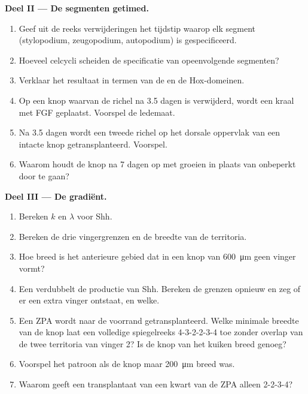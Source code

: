 \begin{problem}
\medskip
\noindent\textbf{Deel II --- De segmenten getimed.}
\begin{enumerate}[resume]
  \item Geef uit de reeks verwijderingen het tijdstip waarop elk segment
        (stylopodium, zeugopodium, autopodium) is gespecificeerd.
  \item Hoeveel celcycli scheiden de specificatie van opeenvolgende
        segmenten?
  \item Verklaar het resultaat in termen van de  en de
        Hox-domeinen.
  \item Op een knop waarvan de richel na 3.5 dagen is verwijderd, wordt een
        kraal met FGF geplaatst. Voorspel de ledemaat.
  \item Na 3.5 dagen wordt een tweede richel op het dorsale oppervlak van
        een intacte knop getransplanteerd. Voorspel.
  \item Waarom houdt de knop na 7 dagen op met groeien in plaats van
        onbeperkt door te gaan?
\end{enumerate}

\medskip
\noindent\textbf{Deel III --- De gradiënt.}
\begin{enumerate}[resume]
  \item Bereken $k$ en $\lambda$ voor Shh.
  \item Bereken de drie vingergrenzen en de breedte van de territoria.
  \item Hoe breed is het anterieure gebied dat in een knop van
        \qty{600}{\micro m} geen vinger vormt?
  \item Een  verdubbelt de productie van Shh. Bereken de grenzen
        opnieuw en zeg of er een extra vinger ontstaat, en welke.
  \item Een ZPA wordt naar de voorrand getransplanteerd. Welke minimale
        breedte van de knop laat een volledige spiegelreeks 4-3-2-2-3-4 toe
        zonder overlap van de twee territoria van vinger 2? Is de knop van
        het kuiken breed genoeg?
  \item Voorspel het patroon als de knop maar \qty{200}{\micro m}
        breed was.
  \item Waarom geeft een transplantaat van een kwart van de ZPA alleen 2-2-3-4?
\end{enumerate}


\end{problem}
